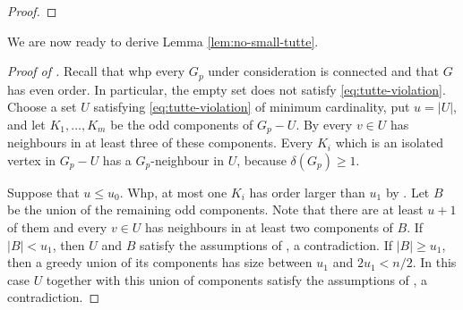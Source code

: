 \documentclass[10pt,a4paper]{article}
\newcommand{\cP}{\mathcal{P}}
\begin{document}
\begin{proof}
\end{proof}

We are now ready to derive Lemma \ref{lem:no-small-tutte}.
\begin{proof}[Proof of ]
Recall that whp every $G_p$ under consideration is connected and that $G$ has even order. In particular, the empty set does not satisfy \eqref{eq:tutte-violation}.
Choose a set $U$ satisfying \eqref{eq:tutte-violation} of minimum cardinality, put $u=|U|$, and let $K_1,\ldots,K_m$ be the odd components of $G_p-U$.
By  every $v\in U$ has neighbours in at least three of these components. 
Every $K_i$ which is an isolated vertex in $G_p-U$ has a $G_p$-neighbour in $U$, because $\delta(G_p)\ge1$.

Suppose that $u \leq u_0$.  
Whp, at most one $K_i$ has order larger than $u_1$ by . Let $B$ be the union of the remaining odd components. Note that there are at least $u+1$ of them and every $v\in U$ has neighbours in at least two components of $B$.
If $|B| < u_1$, then $U$ and $B$ satisfy the assumptions of , a contradiction.
If $|B|\geq u_1$, then a greedy union of its components has size between $u_1$ and $2u_1<n/2$. In this case $U$ together with this union of components satisfy the assumptions of , a contradiction.
\end{proof}
\end{document}
